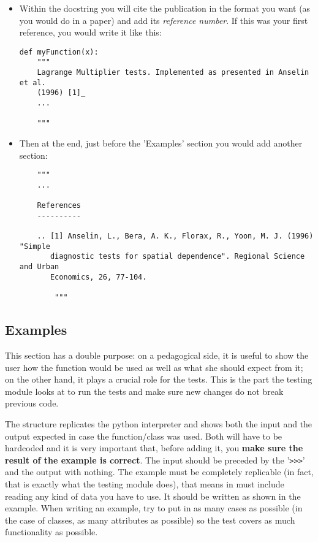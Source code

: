 \documentclass{article}
\begin{document}
\begin{itemize}
    \item Within the docstring you will cite the publication in the format you
        want (as you would do in a paper) and add its \textit{reference
        number}. If this was your first reference, you would write it like
        this:
\begin{verbatim}
def myFunction(x):
    """
    Lagrange Multiplier tests. Implemented as presented in Anselin et al.
    (1996) [1]_
    ...

    """
\end{verbatim}
\item Then at the end, just before the 'Examples' section you would add
    another section:
\begin{verbatim}
    """
    ...

    References
    ----------

    .. [1] Anselin, L., Bera, A. K., Florax, R., Yoon, M. J. (1996) "Simple
       diagnostic tests for spatial dependence". Regional Science and Urban
       Economics, 26, 77-104.

        """
\end{verbatim}

\end{itemize}

\subsection{Examples}
This section has a double purpose: on a pedagogical side, it is useful to show
the user how the function would be used as well as what she should expect from
it; on the other hand, it plays a crucial role for the tests. This is the part
the testing module looks at to run the tests and make sure new changes do not
break previous code.

The structure replicates the python interpreter and shows both the input and
the output expected in case the function/class was used. Both will have to be
hardcoded and it is very important that, before adding it, you
\textbf{make sure the result of the example is correct}. The input should be
preceded by the '\texttt{>>>}' and the output with nothing. The example must be
completely replicable (in fact, that is exactly what the testing module does),
that means in must include reading any kind of data you have to use.
It should be written as shown in the example. When writing an example, try to
put in as many cases as possible (in the case of classes, as many attributes
as possible) so the test covers as much functionality as possible.
\end{document}
